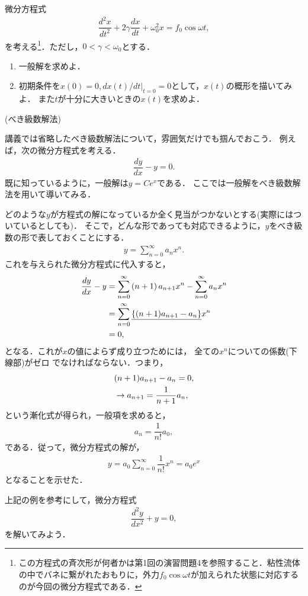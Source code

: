 %
\newpage
%
\enshu
微分方程式
\begin{align*}
 \dfrac{d^2x}{dt^2} + 2\gamma \dfrac{dx}{dt} + \omega_{0}^{2}x = f_0 \cos \omega t, 
\end{align*}
を考える\footnote{この方程式の斉次形が何者かは第1回の演習問題4を参照すること．粘性流体の中でバネに繋がれたおもりに，外力$f_0 \cos \omega t$が加えられた状態に対応するのが今回の微分方程式である．}．ただし，$0< \gamma < \omega_{0}$とする．
\begin{enumerate}[(1)]
  \item 一般解を求めよ．
  \item 初期条件を$x(0)=0, d x(t)/dt|_{t=0}=0$として，$x(t)$の概形を描いてみよ．
	また$t$が十分に大きいときの$x(t)$を求めよ．
\end{enumerate}
%
\enshu (べき級数解法)
%

講義では省略したべき級数解法について，雰囲気だけでも掴んでおこう．
例えば，次の微分方程式を考える．
\begin{align*}
  \dfrac{dy}{dx} - y = 0. 
\end{align*}
既に知っているように，一般解は$y=Ce^{x}$である．
ここでは一般解をべき級数解法を用いて導いてみる．

どのような$y$が方程式の解になっているか全く見当がつかないとする(実際にはついているとしても)．
そこで，どんな形であっても対応できるように，$y$をべき級数の形で表しておくことにする．
\begin{align*}
  y = \sum_{n=0}^{\infty} a_{n}x^{n}. 
\end{align*}
これを与えられた微分方程式に代入すると，
\begin{align*}
  \dfrac{dy}{dx} - y &= \sum_{n=0}^{\infty}\left(n+1\right)a_{n+1}x^n 
                        - \sum_{n=0}^{\infty}a_n x^{n} \notag \\
                     &= \sum_{n=0}^{\infty}\underline{\left\{(n+1)a_{n+1}-a_n\right\}}x^{n} \notag \\
                     &= 0, 
\end{align*}
となる．これが$x$の値によらず成り立つためには，
全ての$x^{n}$についての係数(下線部)がゼロ
でなければならない．つまり，
\begin{align*}
  &(n+1)a_{n+1} - a_n = 0, \notag \\
  &\rightarrow a_{n+1} = \dfrac{1}{n+1}a_{n},
\end{align*}
という漸化式が得られ，一般項を求めると，
\begin{align*}
 a_n = \dfrac{1}{n!}a_0,
\end{align*}
である．従って，微分方程式の解が，
\begin{align*}
  y = a_0 \sum_{n=0}^{\infty}\dfrac{1}{n!}x^n = a_{0}e^{x} 
\end{align*}
となることを示せた．

上記の例を参考にして，微分方程式
\begin{align*}
  \dfrac{d^2y}{dx^2} + y = 0,
\end{align*}
を解いてみよう．
